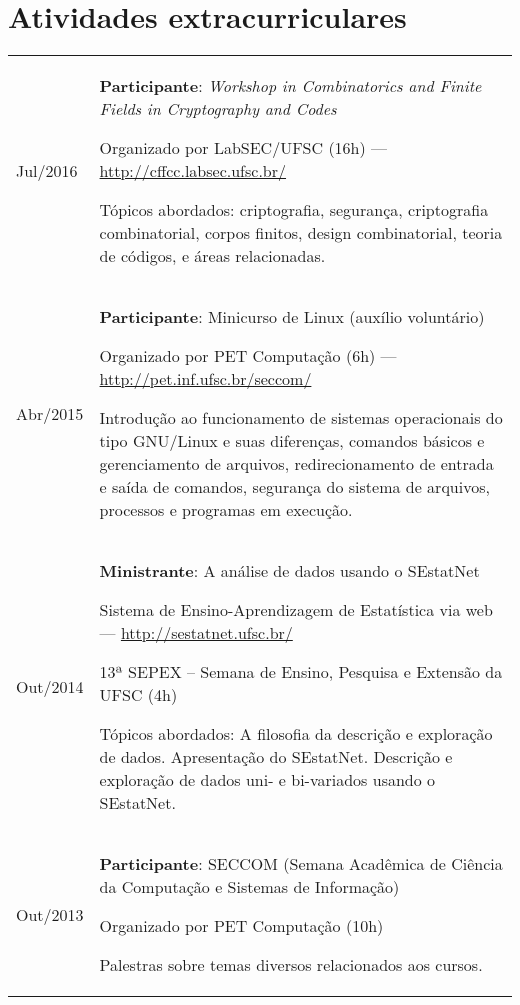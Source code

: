 \documentclass{article}
\newenvironment{contenttable}[1]
  {\section*{#1}
   \newcolumntype{L}{>{\bf \raggedleft}p{0.13\textwidth}}
   \newcolumntype{R}{p{0.82\textwidth}}
   \begin{tabular}{L!{\color{lightgray} \vrule}R}}
  {\end{tabular}}
\newenvironment{smallitem}
  {\vspace{-2mm}\itemize%
   \setlength{\parskip}{0pt}
   \setlength{\itemsep}{2pt}}
  {\vspace{-2mm}\enditemize}
\begin{document}
\begin{contenttable}{Atividades extracurriculares}
  Jul/2016 & \textbf{Participante}: \emph{Workshop in Combinatorics and
    Finite Fields in Cryptography and Codes}
  \begin{smallitem}
    \item Organizado por LabSEC/UFSC (16h) ---
      \url{http://cffcc.labsec.ufsc.br/}
    \item Tópicos abordados: criptografia, segurança, criptografia
      combinatorial, corpos finitos, design combinatorial, teoria
      de códigos, e áreas relacionadas.
  \end{smallitem} \\

  Abr/2015 & \textbf{Participante}: Minicurso de Linux (auxílio voluntário)
  \begin{smallitem}
    \item Organizado por PET Computação (6h) ---
      \url{http://pet.inf.ufsc.br/seccom/}
    \item Introdução ao funcionamento de sistemas operacionais do tipo
      GNU/Linux e suas diferenças, comandos básicos e gerenciamento de
      arquivos, redirecionamento de entrada e saída de comandos, segurança
      do sistema de arquivos, processos e programas em execução.
  \end{smallitem} \\

  Out/2014 & \textbf{Ministrante}: A análise de dados usando o SEstatNet
  \begin{smallitem}
    \item Sistema de Ensino-Aprendizagem de Estatística via web ---
      \url{http://sestatnet.ufsc.br/}
    \item 13ª SEPEX – Semana de Ensino, Pesquisa e Extensão da UFSC (4h)
    \item Tópicos abordados: A filosofia da descrição e exploração de
      dados. Apresentação do SEstatNet. Descrição e exploração de dados uni-
      e bi-variados usando o SEstatNet.
  \end{smallitem} \\

  Out/2013 & \textbf{Participante}: SECCOM {\small (Semana Acadêmica de
    Ciência da Computação e Sistemas de Informação)}
  \begin{smallitem}
    \item Organizado por PET Computação (10h)
    \item Palestras sobre temas diversos relacionados aos cursos.
  \end{smallitem}
\end{contenttable}
\end{document}
